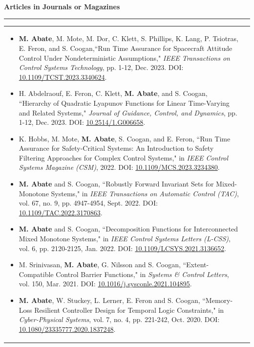 \documentclass{article}
\begin{document}
\noindent\:\:\textbf{\large{Articles in Journals or Magazines}}
\vspace{.1cm}
\hrule
\vspace{.1cm}
\begin{tabular}{ m{6.9in} m{0in}}
\begin{itemize}
    \item[{[J9]}] \textbf{M. Abate}, M. Mote, M. Dor, C. Klett, S. Phillips, K. Lang, P. Tsiotras, E. Feron, and S. Coogan,``Run Time Assurance for Spacecraft Attitude Control Under Nondeterministic Assumptions," \emph{IEEE Transactions on Control Systems Technology}, pp. 1-12, Dec. 2023. DOI: \href{https://doi.org/10.1109/TCST.2023.3340624}{10.1109/TCST.2023.3340624}.
    \item[{[J8]}] H. Abdelraouf, E. Feron, C. Klett, \textbf{M. Abate}, and S. Coogan, ``Hierarchy of Quadratic Lyapunov Functions for Linear Time-Varying and Related Systems," \emph{Journal of Guidance, Control, and Dynamics}, pp. 1-12, Dec. 2023. DOI: \href{https://doi.org/10.2514/1.G006658}{10.2514/1.G006658}.    
    \item[{[J7]}] K. Hobbs, M. Mote, \textbf{M. Abate}, S. Coogan, and E. Feron, ``Run Time Assurance for Safety-Critical Systems: An Introduction to Safety Filtering Approaches for Complex Control Systems," in \emph{IEEE Control Systems Magazine (CSM)}, 2022. DOI: \href{https://doi.org/10.1109/MCS.2023.3234380}{10.1109/MCS.2023.3234380}.
    \item[{[J6]}] \textbf{M. Abate} and S. Coogan, ``Robustly Forward Invariant Sets for Mixed-Monotone Systems," in \emph{IEEE Transactions on Automatic Control (TAC)}, vol. 67, no. 9, pp. 4947-4954, Sept. 2022. DOI: \href{https://ieeexplore.ieee.org/document/9764395}{10.1109/TAC.2022.3170863}.
    \item[{[J5]}] \textbf{M. Abate} and S. Coogan, ``Decomposition Functions for Interconnected Mixed Monotone Systems," in \emph{IEEE Control Systems Letters (L-CSS)}, vol. 6, pp. 2120-2125, Jan. 2022. DOI: \href{https://ieeexplore.ieee.org/document/9656539}{10.1109/LCSYS.2021.3136652}.
    \item[{[J4]}] M. Srinivasan, \textbf{M. Abate}, G. Nilsson and S. Coogan, ``Extent-Compatible Control Barrier Functions," in \emph{Systems \& Control Letters}, vol. 150, Mar. 2021. DOI: \href{https://www.sciencedirect.com/science/article/abs/pii/S0167691121000256}{10.1016/j.sysconle.2021.104895}.
    \item[{[J3]}] \textbf{M. Abate}, W. Stuckey, L. Lerner, E. Feron and S. Coogan, ``Memory-Loss Resilient Controller Design for Temporal Logic Constraints," in \emph{Cyber-Physical Systems}, vol. 7, no. 4, pp. 221-242, Oct. 2020. DOI: \href{https://www.tandfonline.com/doi/abs/10.1080/23335777.2020.1837248}{10.1080/23335777.2020.1837248}.

\end{itemize}
\end{tabular}
\end{document}
